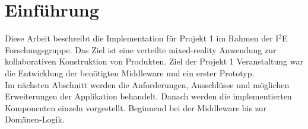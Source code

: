 \section{Einführung}

Diese Arbeit beschreibt die Implementation für Projekt 1 im Rahmen der I$^2$E Forschungsgruppe. Das Ziel ist eine verteilte mixed-reality Anwendung zur kollaborativen Konstruktion von Produkten. Ziel der Projekt 1 Veranstaltung war die Entwicklung der benötigten Middleware und ein erster Prototyp.\\
Im nächsten Abschnitt werden die Anforderungen, Ausschlüsse und möglichen Erweiterungen der Applikation behandelt. Danach werden die implementierten Komponenten einzeln vorgestellt. Beginnend bei der Middleware bis zur Domänen-Logik.